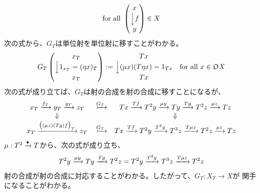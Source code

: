 {\begin{equation*}
\begin{split}
\begin{matrix}
		\end{matrix} \quad\text{for all }\begin{pmatrix}
			x \\ \Big\downarrow{f} \\ y
		\end{pmatrix}\in X
	\end{split}\end{equation*}
	次の式から、$G_T$は単位射を単位射に移すことがわかる。
	\begin{equation*}\begin{split}
		G_T \begin{pmatrix}
			x_T \\ \Big\downarrow{1_{x_T}=(\eta x)_T} \\ x_T
		\end{pmatrix} := \begin{matrix}
			Tx \\ \Big\downarrow{(\mu x)(T\eta x)=1_{Tx}} \\ Tx
		\end{matrix} \quad\text{for all } x\in{\mathfrak{O}} X
	\end{split}\end{equation*}
	次の式が成り立てば、$G_T$は射の合成を射の合成に移すことになるが、
	\begin{equation*}\begin{array}{ccc}
		x_T\xto{f_T}y_T\xto{g_T}z_T &\xmapsto{G_T}&
		Tx\xto{Tf}T^2y\xto{\mu y}Ty\xto{Tg}T^2z\xto{\mu z}Tz \\
		\Downarrow & & \Downarrow \\
		x_T\xto{\plrg{(\mu z)(Tg)f}_T}z_T &\xmapsto{G_T}&
		Tx\xto{Tf}T^2y\xto{T^2g}T^3z\xto{T\mu z}T^2z\xto{\mu z}Tz
	\end{array}\end{equation*}
	$\mu:T^2\xrightarrow[{}]{\bullet}T$から、次の式が成り立ち、
	\begin{equation*}\begin{split}
		T^2y\xrightarrow[{}]{\mu y}Ty\xrightarrow[{}]{Tg}T^2z = T^2y\xrightarrow[{}]{T^2g}T^3z\xrightarrow[{}]{T\mu z}T^2z
	\end{split}\end{equation*}
	射の合成が射の合成に対応することがわかる。したがって、$G_T:X_T\to X$が
	関手になることがわかる。

}
